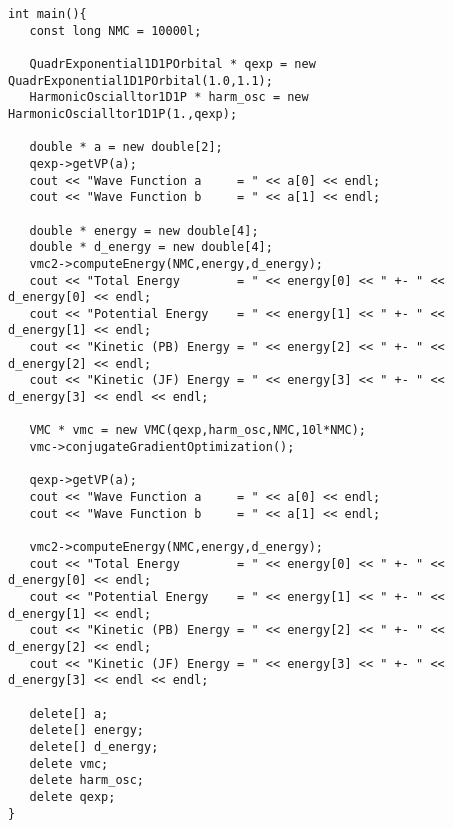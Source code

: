 \documentclass[11pt,a4paper,twoside]{article}
\begin{document}
\begin{lstlisting}
int main(){
   const long NMC = 10000l;
   
   QuadrExponential1D1POrbital * qexp = new QuadrExponential1D1POrbital(1.0,1.1);
   HarmonicOscialltor1D1P * harm_osc = new HarmonicOscialltor1D1P(1.,qexp);
   
   double * a = new double[2];
   qexp->getVP(a);
   cout << "Wave Function a     = " << a[0] << endl;
   cout << "Wave Function b     = " << a[1] << endl;
   
   double * energy = new double[4];
   double * d_energy = new double[4];
   vmc2->computeEnergy(NMC,energy,d_energy);
   cout << "Total Energy        = " << energy[0] << " +- " << d_energy[0] << endl;
   cout << "Potential Energy    = " << energy[1] << " +- " << d_energy[1] << endl;
   cout << "Kinetic (PB) Energy = " << energy[2] << " +- " << d_energy[2] << endl;
   cout << "Kinetic (JF) Energy = " << energy[3] << " +- " << d_energy[3] << endl << endl;
   
   VMC * vmc = new VMC(qexp,harm_osc,NMC,10l*NMC);
   vmc->conjugateGradientOptimization();
   
   qexp->getVP(a);
   cout << "Wave Function a     = " << a[0] << endl;
   cout << "Wave Function b     = " << a[1] << endl;
   
   vmc2->computeEnergy(NMC,energy,d_energy);
   cout << "Total Energy        = " << energy[0] << " +- " << d_energy[0] << endl;
   cout << "Potential Energy    = " << energy[1] << " +- " << d_energy[1] << endl;
   cout << "Kinetic (PB) Energy = " << energy[2] << " +- " << d_energy[2] << endl;
   cout << "Kinetic (JF) Energy = " << energy[3] << " +- " << d_energy[3] << endl << endl;
   
   delete[] a;
   delete[] energy;
   delete[] d_energy;
   delete vmc;
   delete harm_osc;
   delete qexp;
}
\end{lstlisting}





\printindex
\end{document}
